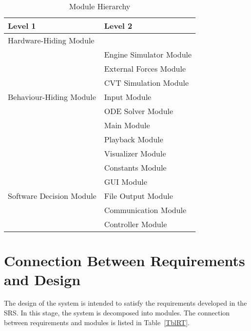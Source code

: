 \documentclass[12pt, titlepage]{article}
\begin{document}
\begin{table}[h!]
\centering
\begin{tabular}{p{} p{}}
\toprule
\textbf{Level 1} & \textbf{Level 2}\\
\midrule

{Hardware-Hiding Module} & ~ \\
\midrule

\multirow{7}{0.3\textwidth}{Behaviour-Hiding Module}
& Engine Simulator Module\\
& External Forces Module\\
& CVT Simulation Module\\
& Input Module\\
& ODE Solver Module\\
& Main Module\\ 
& Playback Module\\
& Visualizer Module\\
& Constants Module\\
\midrule

\multirow{3}{0.3\textwidth}{Software Decision Module}
& GUI Module\\
& File Output Module\\
& Communication Module\\
& Controller Module\\
\bottomrule

\end{tabular}
\caption{Module Hierarchy}
\label{TblMH}
\end{table}

\section{Connection Between Requirements and Design} \label{SecConnection}

The design of the system is intended to satisfy the requirements developed in
the SRS. In this stage, the system is decomposed into modules. The connection
between requirements and modules is listed in Table~\ref{TblRT}.

\end{document}
